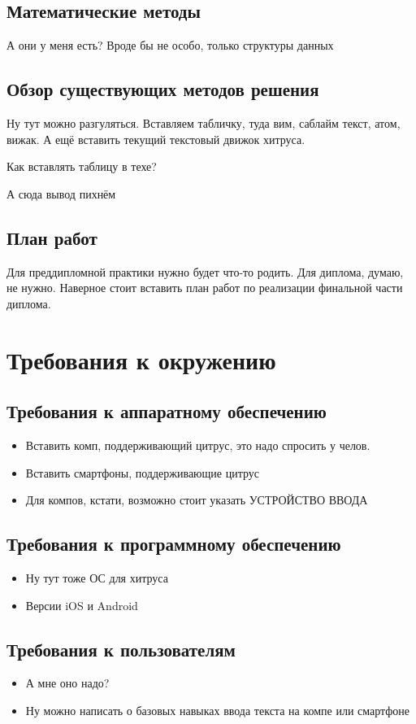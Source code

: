 \documentclass{fefu}
\begin{document}
	\subsection{Математические методы}
	А они у меня есть? Вроде бы не особо, только структуры данных	
	\subsection{Обзор существующих методов решения}
	\par Ну тут можно разгуляться. Вставляем табличку, туда вим, саблайм текст, атом, вижак. А ещё вставить текущий текстовый движок хитруса.
	\par Как вставлять таблицу в техе?	
	\par А сюда вывод пихнём
	\subsection{План работ}
	\par Для преддипломной практики нужно будет что-то родить. Для диплома, думаю, не нужно. Наверное стоит вставить план работ по реализации финальной части диплома.
	
	\section{Требования к окружению}
	\subsection{Требования к аппаратному обеспечению}
	\begin{itemize}
		\item Вставить комп, поддерживающий цитрус, это надо спросить у челов.
		\item Вставить смартфоны, поддерживающие цитрус
		\item Для компов, кстати, возможно стоит указать УСТРОЙСТВО ВВОДА
	\end{itemize}
	\subsection{Требования к программному обеспечению}
	\begin{itemize}
		\item Ну тут тоже ОС для хитруса
		\item Версии iOS и Android
	\end{itemize}
	\subsection{Требования к пользователям}
	\begin{itemize}
		\item А мне оно надо?
		\item Ну можно написать о базовых навыках ввода текста на компе или смартфоне
	\end{itemize}
\end{document}
